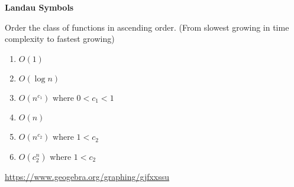 \question \textbf{Landau Symbols}

Order the class of functions in ascending order. (From slowest growing in time complexity
to fastest growing)
\begin{equation}
[O(c_2^n), O(n), O(n^{c_1}), O(n^{c_2}), O(1), O(\log n)]
\end{equation}

\begin{solution}
\begin{enumerate}
\item \(O(1)\)
\item \(O(\log n)\)
\item \(O(n^{c_1})\) where \(0 < c_1 < 1\)
\item \(O(n)\)
\item \(O(n^{c_2})\) where \(1 < c_2\)
\item \(O(c_2^n)\) where \(1 < c_2\)
\end{enumerate}

\url{https://www.geogebra.org/graphing/gjfxxssu}
\end{solution}


